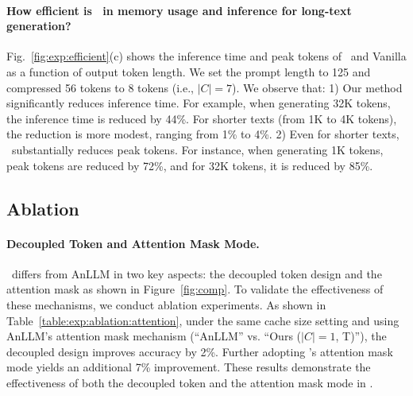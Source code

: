 \paragraph{How efficient is \ours~in memory usage and inference for long-text generation?}
Fig.~\ref{fig:exp:efficient}(c) shows the inference time and peak tokens of \ours~and Vanilla as a function of output token length.
We set the prompt length to 125 and compressed 56 tokens to 8 tokens (i.e., $|C|=7$).
We observe that:
1) Our method significantly reduces inference time. %
For example, when generating 32K tokens, the inference time is reduced by 44\%. 
For shorter texts (from 1K to 4K tokens), the reduction is more modest, ranging from 1\% to 4\%.
2) Even for shorter texts, \ours~substantially reduces peak tokens. 
For instance, when generating 1K tokens, peak tokens are reduced by 72\%, and for 32K tokens, it is reduced by 85\%.


\subsection{Ablation}
\label{ablation}
\paragraph{Decoupled Token and Attention Mask Mode.}
\ours~differs from AnLLM in two key aspects: the decoupled token design and the attention mask as shown in Figure~\ref{fig:comp}. 
To validate the effectiveness of these mechanisms, we conduct ablation experiments.  
As shown in Table~\ref{table:exp:ablation:attention}, under the same cache size setting and using AnLLM's attention mask mechanism (``AnLLM'' vs. ``Ours ($|C|=1$, T)''), the decoupled design improves accuracy by 2\%. 
Further adopting \ours's attention mask mode yields an additional 7\% improvement. 
These results demonstrate the effectiveness of both the decoupled token and the attention mask mode in \ours.

